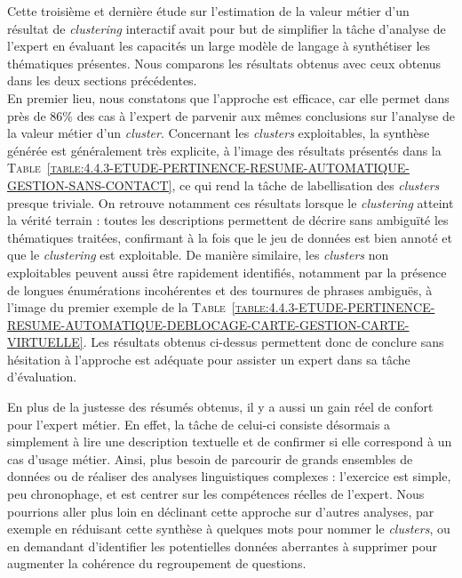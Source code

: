 			Cette troisième et dernière étude sur l'estimation de la valeur métier d'un résultat de \textit{clustering} interactif avait pour but de simplifier la tâche d'analyse de l'expert en évaluant les capacités un large modèle de langage à synthétiser les thématiques présentes.
			Nous comparons les résultats obtenus avec ceux obtenus dans les deux sections précédentes.
			\\
			
			En premier lieu, nous constatons que l'approche est efficace, car elle permet dans près de $86$\% des cas à l'expert de parvenir aux mêmes conclusions sur l'analyse de la valeur métier d'un \textit{cluster}.
			Concernant les \textit{clusters} exploitables, la synthèse générée est généralement très explicite, à l'image des résultats présentés dans la \textsc{Table~\ref{table:4.4.3-ETUDE-PERTINENCE-RESUME-AUTOMATIQUE-GESTION-SANS-CONTACT}}, ce qui rend la tâche de labellisation des \textit{clusters} presque triviale.
			On retrouve notamment ces résultats lorsque le \textit{clustering} atteint la vérité terrain : toutes les descriptions permettent de décrire sans ambiguïté les thématiques traitées, confirmant à la fois que le jeu de données est bien annoté et que le \textit{clustering} est exploitable.
			De manière similaire, les \textit{clusters} non exploitables peuvent aussi être rapidement identifiés, notamment par la présence de longues énumérations incohérentes et des tournures de phrases ambiguës, à l'image du premier exemple de la \textsc{Table~\ref{table:4.4.3-ETUDE-PERTINENCE-RESUME-AUTOMATIQUE-DEBLOCAGE-CARTE-GESTION-CARTE-VIRTUELLE}}.
			Les résultats obtenus ci-dessus permettent donc de conclure sans hésitation à l'approche est adéquate pour assister un expert dans sa tâche d'évaluation.
			
			En plus de la justesse des résumés obtenus, il y a aussi un gain réel de confort pour l'expert métier.
			En effet, la tâche de celui-ci consiste désormais a simplement à lire une description textuelle et de confirmer si elle correspond à un cas d'usage métier.
			Ainsi, plus besoin de parcourir de grands ensembles de données ou de réaliser des analyses linguistiques complexes : l'exercice est simple, peu chronophage, et est centrer sur les compétences réelles de l'expert.
			Nous pourrions aller plus loin en déclinant cette approche sur d'autres analyses, par exemple en réduisant cette synthèse à quelques mots pour nommer le \textit{clusters}, ou en demandant d'identifier les potentielles données aberrantes à supprimer pour augmenter la cohérence du regroupement de questions.
			\\
			
